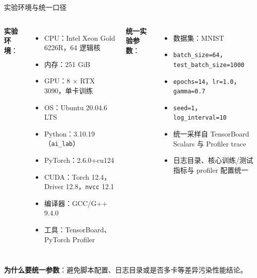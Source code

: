 \documentclass[10pt, aspectratio=169]{beamer}
\begin{document}
\begin{frame}{实验环境与统一口径}
    \begin{columns}[T,totalwidth=\textwidth]
        \textbf{实验环境}：
        \begin{itemize}
            \item CPU：Intel Xeon Gold 6226R，64 逻辑核
            \item 内存：251 GiB
            \item GPU：8 $\times$ RTX 3090，单卡训练
            \item OS：Ubuntu 20.04.6 LTS
            \item Python：3.10.19（\texttt{ai\_lab}）
            \item PyTorch：2.6.0+cu124
            \item CUDA：Torch 12.4，Driver 12.8，\texttt{nvcc} 12.1
            \item 编译器：GCC/G++ 9.4.0
            \item 工具：TensorBoard、PyTorch Profiler
        \end{itemize}

        \textbf{统一实验参数}：
        \begin{itemize}
            \item 数据集：MNIST
            \item \texttt{batch\_size=64}，\texttt{test\_batch\_size=1000}
            \item \texttt{epochs=14}，\texttt{lr=1.0}，\texttt{gamma=0.7}
            \item \texttt{seed=1}，\texttt{log\_interval=10}
            \item 统一采样自 TensorBoard Scalars 与 Profiler trace
            \item 日志目录、核心训练/测试指标与 profiler 配置统一
        \end{itemize}
    \end{columns}

    \vspace{0.15cm}
    \textbf{为什么要统一参数}：避免脚本配置、日志目录或是否多卡等差异污染性能结论。
\end{frame}
\end{document}
